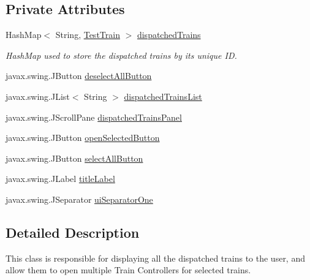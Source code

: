 \subsection*{Private Attributes}
\begin{DoxyCompactItemize}
\item 
Hash\+Map$<$ String, \hyperlink{classTrainControllerComps_1_1TestTrain}{Test\+Train} $>$ \hyperlink{classTrainControllerComps_1_1TCDispatchedTrainFrame_a4861a7d40d80d413c3eaf3d04b1c1856}{dispatched\+Trains}
\begin{DoxyCompactList}\small\item\em Hash\+Map used to store the dispatched trains by its unique ID. \end{DoxyCompactList}\item 
javax.\+swing.\+J\+Button \hyperlink{classTrainControllerComps_1_1TCDispatchedTrainFrame_a9af2d015fabe34c39a0d7106ad1f232f}{deselect\+All\+Button}
\item 
javax.\+swing.\+J\+List$<$ String $>$ \hyperlink{classTrainControllerComps_1_1TCDispatchedTrainFrame_a9d75037726700337edcf8650b2acf4e5}{dispatched\+Trains\+List}
\item 
javax.\+swing.\+J\+Scroll\+Pane \hyperlink{classTrainControllerComps_1_1TCDispatchedTrainFrame_a6b12bfbc7c16813288622bb8041547dc}{dispatched\+Trains\+Panel}
\item 
javax.\+swing.\+J\+Button \hyperlink{classTrainControllerComps_1_1TCDispatchedTrainFrame_a4f8d9159144308d5f7471cb7f9c9500b}{open\+Selected\+Button}
\item 
javax.\+swing.\+J\+Button \hyperlink{classTrainControllerComps_1_1TCDispatchedTrainFrame_aa6abdbfd2b8586691278054853911d2f}{select\+All\+Button}
\item 
javax.\+swing.\+J\+Label \hyperlink{classTrainControllerComps_1_1TCDispatchedTrainFrame_aa1201d92fea0fab4d91da28fb35b6f30}{title\+Label}
\item 
javax.\+swing.\+J\+Separator \hyperlink{classTrainControllerComps_1_1TCDispatchedTrainFrame_a42d0aee0b3cc44b2bb9fa31c26228269}{ui\+Separator\+One}
\end{DoxyCompactItemize}


\subsection{Detailed Description}
This class is responsible for displaying all the dispatched trains to the user, and allow them to open multiple Train Controllers for selected trains. 

